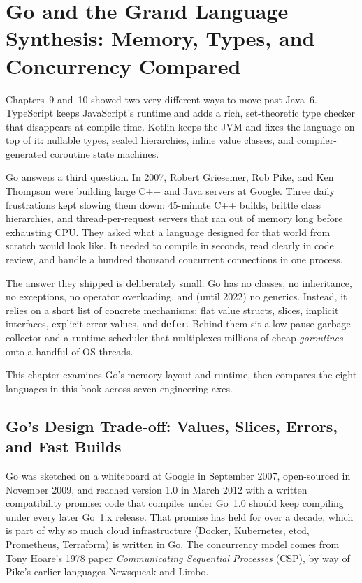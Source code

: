 \chapter{Go and the Grand Language Synthesis: Memory, Types, and Concurrency Compared}
\label{ch:go-grand-synthesis}

Chapters~9 and~10 showed two very different ways to move past Java~6. TypeScript keeps JavaScript's runtime and adds a rich, set-theoretic type checker that disappears at compile time. Kotlin keeps the JVM and fixes the language on top of it: nullable types, sealed hierarchies, inline value classes, and compiler-generated coroutine state machines.

Go answers a third question. In 2007, Robert Griesemer, Rob Pike, and Ken Thompson were building large C++ and Java servers at Google. Three daily frustrations kept slowing them down: 45-minute C++ builds, brittle class hierarchies, and thread-per-request servers that ran out of memory long before exhausting CPU. They asked what a language designed for that world from scratch would look like. It needed to compile in seconds, read clearly in code review, and handle a hundred thousand concurrent connections in one process.

The answer they shipped is deliberately small. Go has no classes, no inheritance, no exceptions, no operator overloading, and (until 2022) no generics. Instead, it relies on a short list of concrete mechanisms: flat value structs, slices, implicit interfaces, explicit error values, and \texttt{defer}. Behind them sit a low-pause garbage collector and a runtime scheduler that multiplexes millions of cheap \emph{goroutines} onto a handful of OS threads.

This chapter examines Go's memory layout and runtime, then compares the eight languages in this book across seven engineering axes.

\chapterline

\section{Go's Design Trade-off: Values, Slices, Errors, and Fast Builds}
\label{ch11:go-design-tradeoff}

\begin{historybox}
Go was sketched on a whiteboard at Google in September 2007, open-sourced in November 2009, and reached version 1.0 in March 2012 with a written compatibility promise: code that compiles under Go~1.0 should keep compiling under every later Go~1.x release. That promise has held for over a decade, which is part of why so much cloud infrastructure (Docker, Kubernetes, etcd, Prometheus, Terraform) is written in Go. The concurrency model comes from Tony Hoare's 1978 paper \emph{Communicating Sequential Processes} (CSP), by way of Pike's earlier languages Newsqueak and Limbo.
\end{historybox}

